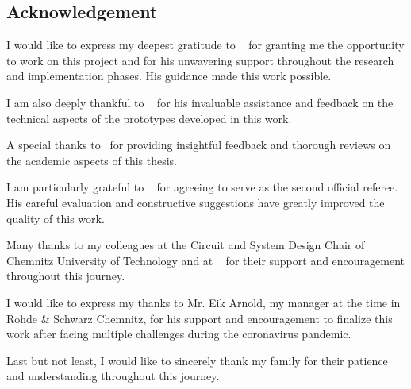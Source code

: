 

\begin{flushleft}
    \section*{\textbf{Acknowledgement}}
    \justifying
    \vskip 1cm

    I would like to express my deepest gratitude to \VARgutachterOne~
    for granting me the opportunity to work on this project and for his
    unwavering support throughout the research and implementation phases.
    His guidance made this work possible.

    I am also deeply thankful to \VARgutachterThree~ for his invaluable
    assistance and feedback on the technical aspects of the prototypes
    developed in this work.

    A special thanks to \VARgutachterFour~for providing insightful
    feedback and thorough reviews on the academic aspects of this thesis.

    I am particularly grateful to \VARgutachterTwo~ for agreeing to serve
    as the second official referee.
    His careful evaluation and constructive suggestions have greatly
    improved the quality of this work.

    Many thanks to my colleagues at the
    Circuit and System Design Chair of Chemnitz University of Technology and
    at \VARindustrypartner~ for their support
    and encouragement throughout this journey.

    I would like to express my thanks to Mr. Eik Arnold, my manager
    at the time in Rohde \& Schwarz Chemnitz, for his support
    and encouragement to finalize this work after facing multiple challenges
    during the coronavirus pandemic.

    Last but not least, I would like to sincerely thank my family for their
    patience and understanding throughout this journey.

\end{flushleft}
